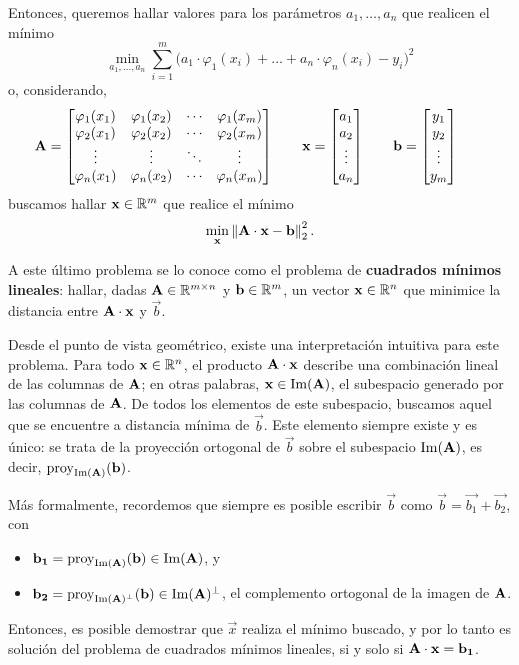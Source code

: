 Entonces, queremos hallar valores para los parámetros $a_1, \dots, a_n$ que
realicen el mínimo
\[ \min_{a_1,\dots,a_n} \sum_{i=1}^{m} \big( a_1 \cdot \varphi_1(x_i)
    + \dots + a_n \cdot \varphi_n(x_i) - y_i \big)^2 \]
o, considerando,
\[ \mathbf{A} = \begin{bmatrix}
    \varphi_1(x_1) & \varphi_1(x_2) & \cdots & \varphi_1(x_m) \\
    \varphi_2(x_1) & \varphi_2(x_2) & \cdots & \varphi_2(x_m) \\
    \vdots         & \vdots         & \ddots & \vdots \\
    \varphi_n(x_1) & \varphi_n(x_2) & \cdots & \varphi_n(x_m) 
\end{bmatrix} \qquad
\mathbf{x} = \begin{bmatrix}
    a_1 \\ a_2 \\ \vdots \\ a_n
\end{bmatrix} \qquad
\mathbf{b} = \begin{bmatrix}
    y_1 \\ y_2 \\ \vdots \\ y_m
\end{bmatrix} \qquad \]
buscamos hallar $\mathbf{x} \in \mathbb{R}^m$ que realice el mínimo
\[ \min_{\mathbf{x}} \left\Vert \mathbf{A} \cdot \mathbf{x} - \mathbf{b} \right\Vert_2^2. \]

A este último problema se lo conoce como el problema de \textbf{cuadrados
mínimos lineales}: hallar, dadas $\mathbf{A} \in \mathbb{R}^{m \times n}$ y $\mathbf{b}
\in \mathbb{R}^m$, un vector $\mathbf{x} \in \mathbb{R}^n$ que minimice la distancia
entre $\mathbf{A} \cdot \mathbf{x}$ y $\vec{b}$.

Desde el punto de vista geométrico, existe una interpretación intuitiva para
este problema. Para todo $\mathbf{x} \in \mathbb{R}^n$, el producto $\mathbf{A}
\cdot \mathbf{x}$ describe una combinación lineal de las columnas de $\mathbf{A}$;
en otras palabras, $\mathbf{x} \in \operatorname{Im}(\mathbf{A})$, el subespacio generado por las
columnas de $\mathbf{A}$. De todos los elementos de este subespacio, buscamos
aquel que se encuentre a distancia mínima de $\vec{b}$. Este elemento siempre
existe y es único: se trata de la proyección ortogonal de $\vec{b}$ sobre el
subespacio $\operatorname{Im}(\mathbf{A})$, es decir, $\operatorname{proy}_{\operatorname{Im}(\mathbf{A})}(\mathbf{b})$.

Más formalmente, recordemos que siempre es posible escribir $\vec{b}$ como
$\vec{b} = \vec{b_1} + \vec{b_2}$, con
\begin{itemize}
\item $\mathbf{b_1} = \operatorname{proy}_{\operatorname{Im}(\mathbf{A})}(\mathbf{b}) \in \operatorname{Im}(\mathbf{A})$, y
\item $\mathbf{b_2} = \operatorname{proy}_{\operatorname{Im}(\mathbf{A})^{\bot}}(\mathbf{b}) \in
    \operatorname{Im}(\mathbf{A})^{\bot}$, el complemento ortogonal de la imagen de $\mathbf{A}$.
\end{itemize}
Entonces, es posible demostrar que $\vec{x}$ realiza el mínimo buscado,
y por lo tanto es solución del problema de cuadrados mínimos lineales,
si y solo si $\mathbf{A} \cdot \mathbf{x} = \mathbf{b_1}$.

